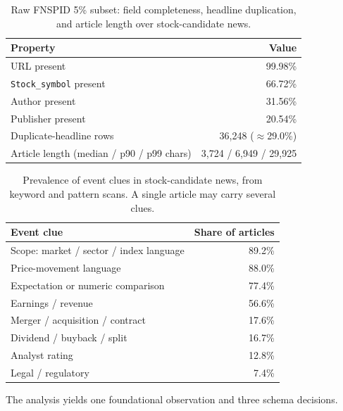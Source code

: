 \documentclass[sigconf,review]{acmart}
\begin{document}
\begin{table}[t]
\caption{Raw FNSPID 5\% subset: field completeness, headline duplication, and article length over stock-candidate news.}
\label{tab:eda_quality}
\centering
\small
\begin{tabular}{lr}
\toprule
Property & Value \\
\midrule
URL present & 99.98\% \\
\texttt{Stock\_symbol} present & 66.72\% \\
Author present & 31.56\% \\
Publisher present & 20.54\% \\
\midrule
Duplicate-headline rows & 36{,}248 ($\approx$29.0\%) \\
Article length (median / p90 / p99 chars) & 3{,}724 / 6{,}949 / 29{,}925 \\
\bottomrule
\end{tabular}
\end{table}

\begin{table}[t]
\caption{Prevalence of event clues in stock-candidate news, from keyword and pattern scans. A single article may carry several clues.}
\label{tab:eda_clues}
\centering
\small
\begin{tabular}{lr}
\toprule
Event clue & Share of articles \\
\midrule
Scope: market / sector / index language & 89.2\% \\
Price-movement language & 88.0\% \\
Expectation or numeric comparison & 77.4\% \\
Earnings / revenue & 56.6\% \\
Merger / acquisition / contract & 17.6\% \\
Dividend / buyback / split & 16.7\% \\
Analyst rating & 12.8\% \\
Legal / regulatory & 7.4\% \\
\bottomrule
\end{tabular}
\end{table}

The analysis yields one foundational observation and three schema decisions.
\end{document}
